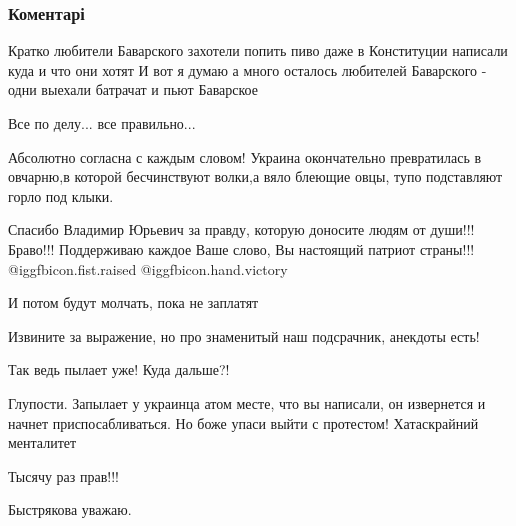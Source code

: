  
 
 
 
 
\subsubsection{Коментарі}

\begin{itemize} %

Кратко любители Баварского захотели попить пиво даже в Конституции написали
куда и что они хотят И вот я думаю а много осталось любителей Баварского - одни
выехали батрачат и пьют Баварское

Все по делу... все правильно...


Абсолютно согласна с каждым словом! Украина окончательно превратилась в
овчарню,в которой бесчинствуют волки,а вяло блеющие овцы, тупо подставляют
горло под клыки.


Спасибо Владимир Юрьевич за правду, которую доносите людям от души!!! Браво!!!
Поддерживаю каждое Ваше слово, Вы настоящий патриот страны!!! @igg{fbicon.fist.raised} @igg{fbicon.hand.victory}

И потом будут молчать, пока не заплатят

Извините за выражение, но про знаменитый наш подсрачник, анекдоты есть!

Так ведь пылает уже! Куда дальше?!


Глупости. Запылает у украинца атом месте, что вы написали, он извернется и
начнет приспосабливаться. Но боже упаси выйти с протестом! Хатаскрайний
менталитет

Тысячу раз прав!!!

Быстрякова уважаю.


\end{itemize} %
